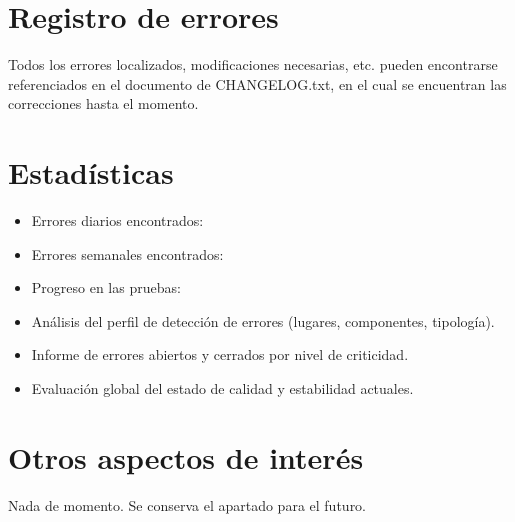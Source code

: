 \documentclass[12pt, a4paper, titlepage]{article}
\begin{document}
	\section{Registro de errores}
	
	Todos los errores localizados, modificaciones necesarias, etc. pueden encontrarse referenciados en el documento de CHANGELOG.txt, en el cual se encuentran las correcciones hasta el momento.
	
	
	\section{Estadísticas}
	
	\begin{itemize}
		\item Errores diarios encontrados:
		\item Errores semanales encontrados:
		\item Progreso en las pruebas:
		\item Análisis del perfil de detección de errores (lugares, componentes, tipología).
		\item Informe de errores abiertos y cerrados por nivel de criticidad.
		\item Evaluación global del estado de calidad y estabilidad actuales.
	\end{itemize}
	
	\section{Otros aspectos de interés}
	
	Nada de momento. Se conserva el apartado para el futuro.
	
\end{document}
